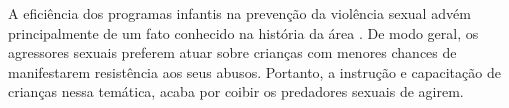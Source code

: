 
A eficiência dos programas infantis na prevenção da violência sexual advém principalmente de um fato conhecido na história da área \cite{budin1989sex}. De modo geral, os agressores sexuais preferem atuar sobre crianças com menores chances de manifestarem resistência aos seus abusos. Portanto, a instrução e capacitação de crianças nessa temática, acaba por coibir os predadores sexuais de agirem. %












